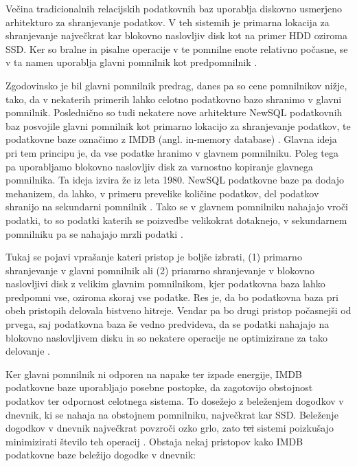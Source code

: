 \documentclass[a4paper, 12pt]{book}
\providecommand{\DIFaddtex}[1]{{\protect\color{blue}\uwave{#1}}} %
\providecommand{\DIFdeltex}[1]{{\protect\color{red}\sout{#1}}}                      %
\providecommand{\DIFaddbegin}{} %
\providecommand{\DIFaddend}{} %
\providecommand{\DIFdelbegin}{} %
\providecommand{\DIFdelend}{} %
\providecommand{\DIFadd}[1]{\texorpdfstring{\DIFaddtex{#1}}{#1}} %
\providecommand{\DIFdel}[1]{\texorpdfstring{\DIFdeltex{#1}}{}} %
\newcommand{\DIFscaledelfig}{0.5}
\newlength{\DIFdelgraphicswidth} %
\newlength{\DIFdelgraphicsheight} %
\newcommand{\DIFaddincludegraphics}[2][]{{\color{blue}\fbox{\DIFOincludegraphics[#1]{#2}}}} %
\newcommand{\DIFdelincludegraphics}[2][]{%
\sbox{\DIFdelgraphicsbox}{\DIFOincludegraphics[#1]{#2}}%
\settoboxwidth{\DIFdelgraphicswidth}{\DIFdelgraphicsbox} %
\settoboxtotalheight{\DIFdelgraphicsheight}{\DIFdelgraphicsbox} %
\scalebox{\DIFscaledelfig}{%
\parbox[b]{\DIFdelgraphicswidth}{\usebox{\DIFdelgraphicsbox}\\[-\baselineskip] \rule{\DIFdelgraphicswidth}{0em}}\llap{\resizebox{\DIFdelgraphicswidth}{\DIFdelgraphicsheight}{%
\setlength{\unitlength}{\DIFdelgraphicswidth}%
\begin{picture}(1,1)%
\thicklines\linethickness{2pt} %
{\color[rgb]{1,0,0}\put(0,0){\framebox(1,1){}}}%
{\color[rgb]{1,0,0}\put(0,0){\line( 1,1){1}}}%
{\color[rgb]{1,0,0}\put(0,1){\line(1,-1){1}}}%
\end{picture}%
}\hspace*{3pt}}} %
} %
\DeclareRobustCommand{\DIFaddbegin}{\DIFOaddbegin \let\includegraphics\DIFaddincludegraphics} %
\DeclareRobustCommand{\DIFaddend}{\DIFOaddend \let\includegraphics\DIFOincludegraphics} %
\DeclareRobustCommand{\DIFdelbegin}{\DIFOdelbegin \let\includegraphics\DIFdelincludegraphics} %
\DeclareRobustCommand{\DIFdelend}{\DIFOaddend \let\includegraphics\DIFOincludegraphics} %
\begin{document}
Večina tradicionalnih relacijskih podatkovnih baz uporablja diskovno usmerjeno arhitekturo za shranjevanje podatkov. V teh sistemih je primarna lokacija za shranjevanje največkrat kar blokovno naslovljiv disk kot na primer HDD oziroma SSD. Ker so bralne in pisalne operacije v te pomnilne enote relativno počasne, se v ta namen uporablja glavni pomnilnik kot predpomnilnik \cite{Pavlo2016Sep}.

Zgodovinsko je bil glavni pomnilnik predrag, danes pa so cene pomnilnikov nižje, tako, da v nekaterih primerih lahko celotno podatkovno bazo shranimo v glavni pomnilnik. Poslednično so tudi nekatere nove arhitekture NewSQL podatkovnih baz posvojile glavni pomnilnik kot primarno lokacijo za shranjevanje podatkov, te podatkovne baze označimo z IMDB (angl. in-memory database) \cite{NewSqlInMemoryAnalytics}. Glavna ideja pri tem principu je, da vse podatke hranimo v glavnem pomnilniku. Poleg tega pa uporabljamo blokovno naslovljiv disk za varnostno kopiranje glavnega pomnilnika. Ta ideja izvira že iz leta 1980.
NewSQL podatkovne baze pa dodajo mehanizem, da lahko, v primeru prevelike količine podatkov, del podatkov shranijo na sekundarni pomnilnik \cite{Pavlo2016Sep}. Tako se v glavnem pomnilniku nahajajo vroči podatki, to so podatki katerih se po\-iz\-ved\-be velikokrat dotaknejo, v sekundarnem pomnilniku pa se nahajajo mrzli podatki \cite{NewSqlInMemoryAnalytics}.

Tukaj se pojavi vprašanje kateri pristop je boljše izbrati, (1) primarno shranjevanje v glavni pomnilnik ali (2) priamrno shranjevanje v blokovno naslovljivi disk z velikim glavnim pomnilnikom, kjer podatkovna baza lahko predpomni vse, oziroma skoraj vse podatke. Res je, da bo podatkovna baza pri obeh pristopih delovala bistveno hitreje. Vendar pa bo drugi pristop počasnejši od prvega, saj podatkovna baza še vedno predvideva, da se podatki nahajajo na blokovno naslovljivem disku in so nekatere operacije ne optimizirane za tako delovanje \cite{garcia1992main}.

Ker glavni pomnilnik ni odporen na napake ter izpade energije, IMDB podatkovne baze uporabljajo posebne postopke, da zagotovijo obstojnost podatkov ter odpornost celotnega sistema. To dosežejo z beleženjem dogodkov v dnevnik, ki se nahaja na obstojnem pomnilniku, največkrat kar SSD. Beleženje dogodkov v dnevnik največkrat povzroči ozko grlo, zato \DIFdelbegin \DIFdel{tei }\DIFdelend \DIFaddbegin \DIFadd{ti }\DIFaddend sistemi poizkušajo minimizirati število teh operacij \cite{MainMemoryDatabaseSystems}. Obstaja nekaj pristopov kako IMDB podatkovne baze beležijo dogodke v dnevnik:
\end{document}
